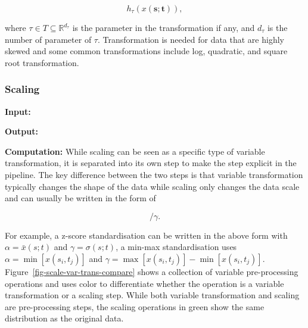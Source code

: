 \documentclass[
]{interact}
\begin{document}
\begin{equation}
h_{\tau}(x(\mathbf{s};\mathbf{t})),
\end{equation}

where \(\tau \in T \subseteq \mathbb{R}^{d_{\tau}}\) is the parameter in
the transformation if any, and \(d_{\tau}\) is the number of parameter
of \(\tau\). Transformation is needed for data that are highly skewed
and some common transformations include log, quadratic, and square root
transformation.

\hypertarget{scaling}{%
\subsubsection{Scaling}\label{scaling}}

\textbf{Input: }

\textbf{Output: }

\textbf{Computation:} While scaling can be seen as a specific type of
variable transformation, it is separated into its own step to make the
step explicit in the pipeline. The key difference between the two steps
is that variable transformation typically changes the shape of the data
while scaling only changes the data scale and can usually be written in
the form of

\begin{equation}
[x(s_i;t_j) - \alpha]/\gamma.
\end{equation}

For example, a z-score standardisation can be written in the above form
with \(\alpha = \bar{x}(s; t)\) and \(\gamma = \sigma(s; t)\), a min-max
standardisation uses \(\alpha = \min[x(s_i, t_j)]\) and
\(\gamma = \max[x(s_i, t_j)] - \min[x(s_i, t_j)]\).
Figure~\ref{fig-scale-var-trans-compare} shows a collection of variable
pre-processing operations and uses color to differentiate whether the
operation is a variable transformation or a scaling step. While both
variable transformation and scaling are pre-processing steps, the
scaling operations in green show the same distribution as the original
data.
\end{document}

